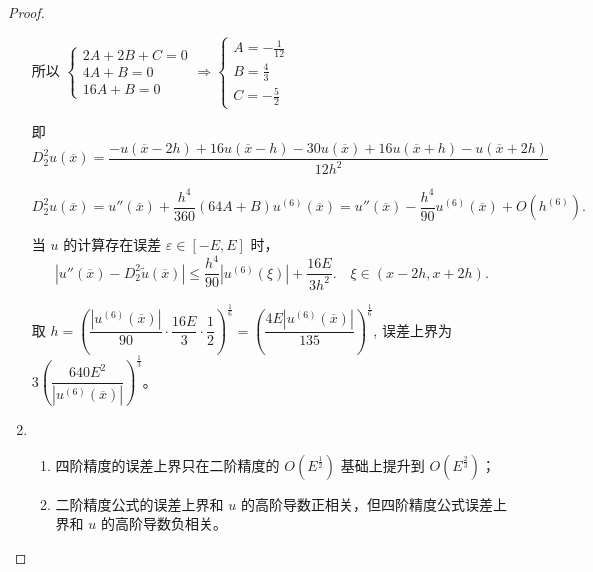 \documentclass[lang=cn,a4paper,newtx,bibend=bibtex]{elegantpaper}
\newcommand{\wanwan}[1]{\tilde{#1}}
\begin{document}
\begin{proof}
\begin{enumerate}
所以 $\begin{cases}
2A + 2B + C = 0 \\
4A + B = 0\\
16A + B = 0
\end{cases} \Rightarrow \begin{cases}
A = -\frac1{12} \\
B = \frac43 \\
C = -\frac52
\end{cases}
$

即 $D_2^2 u(\overline{x}) = \dfrac{-u(\overline{x} - 2h) + 16u(\overline{x} - h) - 30 u(\overline{x}) + 16u(\overline{x} + h) - u(\overline{x} + 2h)}{12h^2}$ 

$D_2^2 u(\overline{x}) = u''(\overline{x}) + \dfrac{h^4}{360} (64A + B) u^{(6)}(\overline{x}) = u''(\overline{x}) - \dfrac{h^4}{90} u^{(6)} (\overline{x}) + O(h^{(6)}).$

当 $u$ 的计算存在误差 $\varepsilon \in [-E, E]$ 时，
\[|u''(\overline{x}) - D_2^2\wanwan{u} (\overline{x})| \le \frac{h^4}{90} |u^{(6)}(\xi)| + \dfrac{16E}{3h^2}. \quad \xi \in (x - 2h, x+2h).\]

取 $h = \left(\dfrac{|u^{(6)}(\overline{x})|}{90} \cdot \dfrac{16E}{3} \cdot \dfrac12\right)^{\frac16} = \left(\dfrac{4E|u^{(6)}(\overline{x})|}{135}\right)^{\frac16}$, 误差上界为 $3\left(\dfrac{640E^2}{|u^{(6)}(\overline{x})|}\right)^{\frac13}$。

\item 
\begin{enumerate}
\item 四阶精度的误差上界只在二阶精度的 $O(E^{\frac12})$ 基础上提升到 $O(E^{\frac23})$；
\item 二阶精度公式的误差上界和 $u$ 的高阶导数正相关，但四阶精度公式误差上界和 $u$ 的高阶导数负相关。
\end{enumerate}
\end{enumerate}
\end{proof}

\nocite{*}
\printbibliography[heading=bibintoc, title=\ebibname]
\end{document}
